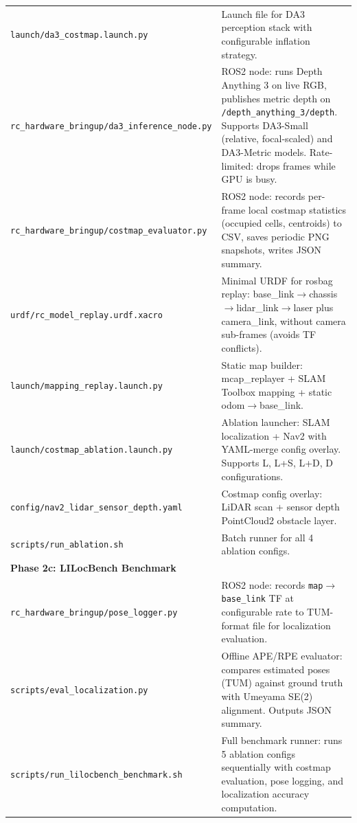 \documentclass[11pt,a4paper]{article}
\begin{document}
\begin{longtable}{lp{9cm}}
\texttt{launch/da3\_costmap.launch.py} & Launch file for DA3 perception
  stack with configurable inflation strategy. \\
\texttt{rc\_hardware\_bringup/da3\_inference\_node.py} & ROS2 node:
  runs Depth Anything 3 on live RGB, publishes metric depth on
  \texttt{/depth\_anything\_3/depth}.  Supports DA3-Small (relative,
  focal-scaled) and DA3-Metric models.  Rate-limited: drops frames
  while GPU is busy. \\
\texttt{rc\_hardware\_bringup/costmap\_evaluator.py} & ROS2 node:
  records per-frame local costmap statistics (occupied cells, centroids)
  to CSV, saves periodic PNG snapshots, writes JSON summary. \\
\texttt{urdf/rc\_model\_replay.urdf.xacro} & Minimal URDF for rosbag
  replay: base\_link$\to$chassis$\to$lidar\_link$\to$laser plus
  camera\_link, without camera sub-frames (avoids TF conflicts). \\
\texttt{launch/mapping\_replay.launch.py} & Static map builder:
  mcap\_replayer + SLAM Toolbox mapping + static odom$\to$base\_link. \\
\texttt{launch/costmap\_ablation.launch.py} & Ablation launcher: SLAM
  localization + Nav2 with YAML-merge config overlay. Supports
  L, L+S, L+D, D configurations. \\
\texttt{config/nav2\_lidar\_sensor\_depth.yaml} & Costmap config overlay:
  LiDAR scan + sensor depth PointCloud2 obstacle layer. \\
\texttt{scripts/run\_ablation.sh} & Batch runner for all 4 ablation configs. \\
\midrule
\multicolumn{2}{l}{\textbf{Phase 2c: LILocBench Benchmark}} \\
\midrule
\texttt{rc\_hardware\_bringup/pose\_logger.py} & ROS2 node: records
  \texttt{map}$\to$\texttt{base\_link} TF at configurable rate to
  TUM-format file for localization evaluation. \\
\texttt{scripts/eval\_localization.py} & Offline APE/RPE evaluator:
  compares estimated poses (TUM) against ground truth with Umeyama
  SE(2) alignment.  Outputs JSON summary. \\
\texttt{scripts/run\_lilocbench\_benchmark.sh} & Full benchmark runner:
  runs 5 ablation configs sequentially with costmap evaluation, pose
  logging, and localization accuracy computation. \\
\bottomrule
\end{longtable}

\end{document}
